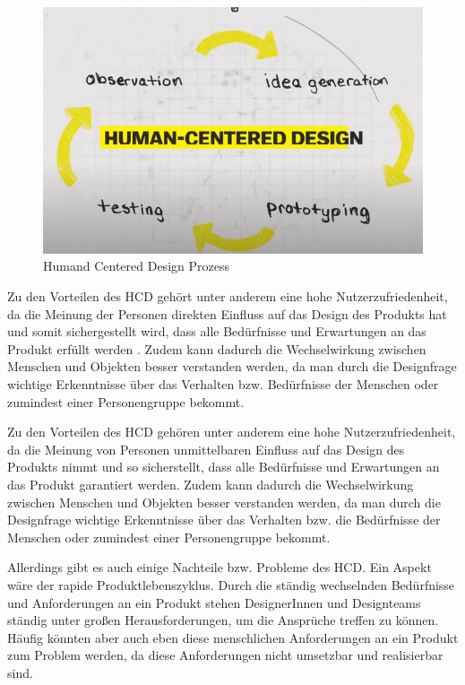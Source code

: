 \begin{figure}[h]
    \centering
    \includegraphics[width=1\textwidth]{images/03/HCD.jpg}
    \caption{Humand Centered Design Prozess}
\end{figure}

Zu den Vorteilen des \acs{HCD} gehört unter anderem eine hohe Nutzerzufriedenheit, da die Meinung der Personen direkten Einfluss auf das Design des Produkts hat und somit sichergestellt wird, dass alle Bedürfnisse und Erwartungen an das Produkt erfüllt werden \cite{hcd:2021}. Zudem kann dadurch die Wechselwirkung zwischen Menschen und Objekten besser verstanden werden, da man durch die Designfrage wichtige Erkenntnisse über das Verhalten bzw. Bedürfnisse der Menschen oder zumindest einer Personengruppe bekommt. \cite{let:2022}

Zu den Vorteilen des \acs{HCD} gehören unter anderem eine hohe Nutzerzufriedenheit, da die Meinung von Personen unmittelbaren Einfluss auf das Design des Produkts nimmt und so sicherstellt, dass alle Bedürfnisse und Erwartungen an das Produkt garantiert werden.\cite{hcd:2021} Zudem kann dadurch die Wechselwirkung zwischen Menschen und Objekten besser verstanden werden, da man durch die Designfrage wichtige Erkenntnisse über das Verhalten bzw. die Bedürfnisse der Menschen oder zumindest einer Personengruppe bekommt.\cite{let:2022}

Allerdings gibt es auch einige Nachteile bzw. Probleme des \acs{HCD}. Ein Aspekt wäre der rapide Produktlebenszyklus. Durch die ständig wechselnden Bedürfnisse und Anforderungen an ein Produkt stehen DesignerInnen und Designteams ständig unter großen Herausforderungen, um die Ansprüche treffen zu können. Häufig könnten aber auch eben diese menschlichen Anforderungen an ein Produkt zum Problem werden, da diese Anforderungen nicht umsetzbar und realisierbar sind.\cite{pod:2016}

